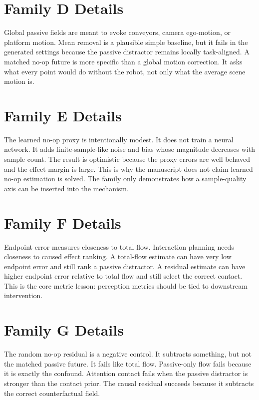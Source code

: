 \documentclass{article}
\begin{document}
\section{Family D Details}

Global passive fields are meant to evoke conveyors, camera ego-motion, or platform
motion.  Mean removal is a plausible simple baseline, but it fails in the generated
settings because the passive distractor remains locally task-aligned.  A matched no-op
future is more specific than a global motion correction.  It asks what every point would
do without the robot, not only what the average scene motion is.

\section{Family E Details}

The learned no-op proxy is intentionally modest.  It does not train a neural network.  It
adds finite-sample-like noise and bias whose magnitude decreases with sample count.  The
result is optimistic because the proxy errors are well behaved and the effect margin is
large.  This is why the manuscript does not claim learned no-op estimation is solved.
The family only demonstrates how a sample-quality axis can be inserted into the
mechanism.

\section{Family F Details}

Endpoint error measures closeness to total flow.  Interaction planning needs closeness to
caused effect ranking.  A total-flow estimate can have very low endpoint error and still
rank a passive distractor.  A residual estimate can have higher endpoint error relative
to total flow and still select the correct contact.  This is the core metric lesson:
perception metrics should be tied to downstream intervention.

\section{Family G Details}

The random no-op residual is a negative control.  It subtracts something, but not the
matched passive future.  It fails like total flow.  Passive-only flow fails because it is
exactly the confound.  Attention contact fails when the passive distractor is stronger
than the contact prior.  The causal residual succeeds because it subtracts the correct
counterfactual field.
\end{document}
